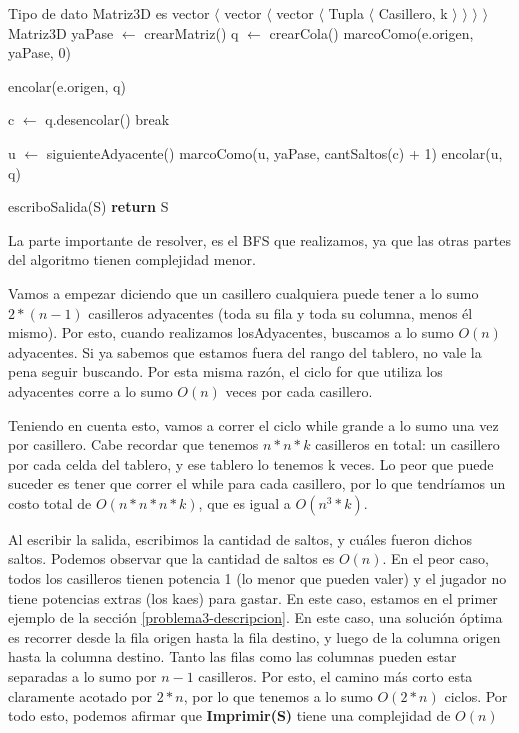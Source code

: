 \begin{pseudo}
\State Tipo de dato Matriz3D es vector $\langle$ vector $\langle$ vector $\langle$ Tupla $\langle$ Casillero, k $\rangle$ $\rangle$ $\rangle$ $\rangle$
        \State Matriz3D yaPase $\leftarrow$ crearMatriz() 
		\State q $\leftarrow$ crearCola() 
		\State marcoComo(e.origen, yaPase, 0) 
		
		\State encolar(e.origen, q) 
		
		 
			\State c $\leftarrow$ q.desencolar() 
				\State break
			\EndIf
			
			 
				\State u $\leftarrow$ siguienteAdyacente() 
        		 
					\State marcoComo(u, yaPase, cantSaltos(c) + 1) 
					\State encolar(u, q) 
				\EndIf
      		\EndFor
		\EndWhile

      	\State escriboSalida(S) 
      	\State \textbf{return} S
        
    \EndProcedure
\end{pseudo}

La parte importante de resolver, es el BFS que realizamos, ya que las otras partes del algoritmo tienen complejidad menor.

Vamos a empezar diciendo que un casillero cualquiera puede tener a lo sumo $2*(n-1)$ casilleros adyacentes (toda su fila y toda su columna, menos él mismo). Por esto, cuando realizamos losAdyacentes, buscamos a lo sumo $O(n)$ adyacentes. Si ya sabemos que estamos fuera del rango del tablero, no vale la pena seguir buscando. Por esta misma razón, el ciclo for que utiliza los adyacentes corre a lo sumo $O(n)$ veces por cada casillero.

Teniendo en cuenta esto, vamos a correr el ciclo while grande a lo sumo una vez por casillero. Cabe recordar que tenemos $n*n*k$ casilleros en total: un casillero por cada celda del tablero, y ese tablero lo tenemos k veces. Lo peor que puede suceder es tener que correr el while para cada casillero, por lo que tendríamos un costo total de $O(n*n*n*k)$, que es igual a $O(n^3*k)$.

Al escribir la salida, escribimos la cantidad de saltos, y cuáles fueron dichos saltos. Podemos observar que la cantidad de saltos es $O(n)$. En el peor caso, todos los casilleros tienen potencia 1 (lo menor que pueden valer) y el jugador no tiene potencias extras (los kaes) para gastar. En este caso, estamos en el primer ejemplo de la sección  \ref{problema3-descripcion}. En este caso, una solución óptima es recorrer desde la fila origen hasta la fila destino, y luego de la columna origen hasta la columna destino. Tanto las filas como las columnas pueden estar separadas a lo sumo por $n-1$ casilleros. Por esto, el camino más corto esta claramente acotado por $2*n$, por lo que tenemos a lo sumo $O(2*n)$ ciclos. Por todo esto, podemos afirmar que \textbf{Imprimir(S)} tiene una complejidad de $O(n)$

